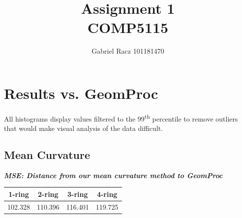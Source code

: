 \documentclass{article}
\title{%
    Assignment 1 \\
    \Large COMP5115}
\author{%
    Gabriel Racz 101181470
   }
\renewcommand{\i}[1]{\textit{{#1}}}
\renewcommand{\b}[1]{\textbf{{#1}}}
\begin{document}
\maketitle
\pagebreak

\section{Results vs. GeomProc}
All histograms display values filtered to the 99\textsuperscript{th} percentile to
remove outliers that would make visual analysis of the data difficult.
\subsection{Mean Curvature}
\begin{center}
\b{\i{MSE: Distance from our mean curvature method to GeomProc}}
\smallbreak
\begin{tabular}{|c|c|c|c|}
    \hline
    1-ring & 2-ring & 3-ring & 4-ring \\
    \hline
    102.328 &  110.396 & 116.401 & 119.725 \\
    \hline
\end{tabular}
\end{center}
\end{document}
